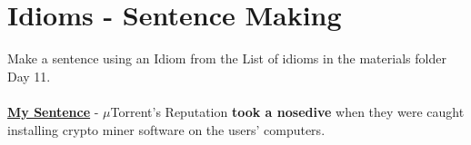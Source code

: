 \documentclass[a4paper,30pt]{report}
\begin{document}
    \section{Idioms - Sentence Making} 
      Make a sentence using an Idiom from the List of idioms in the materials folder Day 11.\\\\

      \textbf{\underline{My Sentence}} - $\mu$Torrent's Reputation \textbf{took a nosedive} when they were caught installing crypto miner software on the users' computers.
    
  
\end{document}
